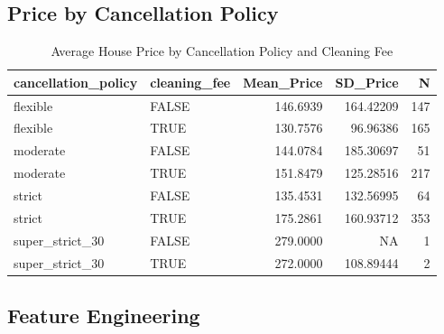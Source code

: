 \documentclass[]{book}
\newenvironment{Shaded}{\begin{snugshade}}{\end{snugshade}}
\newcommand{\KeywordTok}[1]{\textcolor[rgb]{0.13,0.29,0.53}{\textbf{#1}}}
\newcommand{\DataTypeTok}[1]{\textcolor[rgb]{0.13,0.29,0.53}{#1}}
\newcommand{\StringTok}[1]{\textcolor[rgb]{0.31,0.60,0.02}{#1}}
\newcommand{\OperatorTok}[1]{\textcolor[rgb]{0.81,0.36,0.00}{\textbf{#1}}}
\newcommand{\NormalTok}[1]{#1}
\begin{document}
\subsection{Price by Cancellation
Policy}\label{price-by-cancellation-policy}

\begin{Shaded}
\end{Shaded}

\begin{table}

\caption{\label{tab:unnamed-chunk-675}Average House Price by Cancellation Policy and Cleaning Fee}
\centering
\begin{tabular}[t]{l|l|r|r|r}
\hline
cancellation\_policy & cleaning\_fee & Mean\_Price & SD\_Price & N\\
\hline
flexible & FALSE & 146.6939 & 164.42209 & 147\\
\hline
flexible & TRUE & 130.7576 & 96.96386 & 165\\
\hline
moderate & FALSE & 144.0784 & 185.30697 & 51\\
\hline
moderate & TRUE & 151.8479 & 125.28516 & 217\\
\hline
strict & FALSE & 135.4531 & 132.56995 & 64\\
\hline
strict & TRUE & 175.2861 & 160.93712 & 353\\
\hline
super\_strict\_30 & FALSE & 279.0000 & NA & 1\\
\hline
super\_strict\_30 & TRUE & 272.0000 & 108.89444 & 2\\
\hline
\end{tabular}
\end{table}

\subsection{Feature Engineering}\label{feature-engineering}
\end{document}
